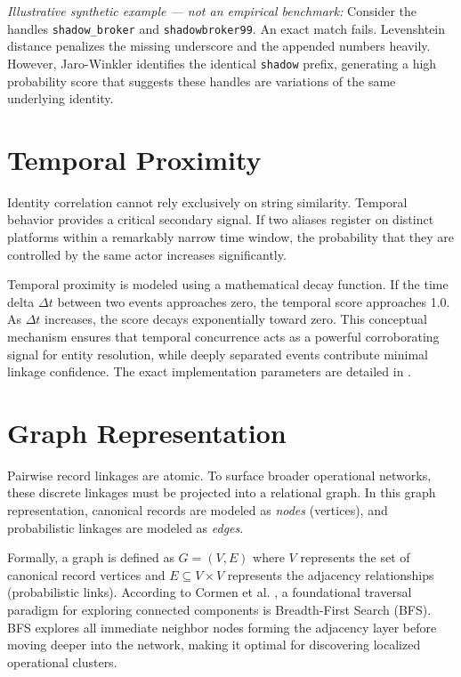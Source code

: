 \textit{Illustrative synthetic example — not an empirical benchmark:}
Consider the handles \texttt{shadow\_broker} and \texttt{shadowbroker99}. An exact match fails. Levenshtein distance penalizes the missing underscore and the appended numbers heavily. However, Jaro-Winkler identifies the identical \texttt{shadow} prefix, generating a high probability score that suggests these handles are variations of the same underlying identity.

\section{Temporal Proximity}
\label{sec:foundations-temporal}
Identity correlation cannot rely exclusively on string similarity. Temporal behavior provides a critical secondary signal. If two aliases register on distinct platforms within a remarkably narrow time window, the probability that they are controlled by the same actor increases significantly.

Temporal proximity is modeled using a mathematical decay function. If the time delta $\Delta t$ between two events approaches zero, the temporal score approaches 1.0. As $\Delta t$ increases, the score decays exponentially toward zero. This conceptual mechanism ensures that temporal concurrence acts as a powerful corroborating signal for entity resolution, while deeply separated events contribute minimal linkage confidence. The exact implementation parameters are detailed in .

\section{Graph Representation}
\label{sec:foundations-graph}
Pairwise record linkages are atomic. To surface broader operational networks, these discrete linkages must be projected into a relational graph. In this graph representation, canonical records are modeled as \textit{nodes} (vertices), and probabilistic linkages are modeled as \textit{edges}.

Formally, a graph is defined as $G = (V, E)$ where $V$ represents the set of canonical record vertices and $E \subseteq V \times V$ represents the adjacency relationships (probabilistic links). According to Cormen et al. \cite{cormen2009introduction}, a foundational traversal paradigm for exploring connected components is Breadth-First Search (BFS). BFS explores all immediate neighbor nodes forming the adjacency layer before moving deeper into the network, making it optimal for discovering localized operational clusters. 

